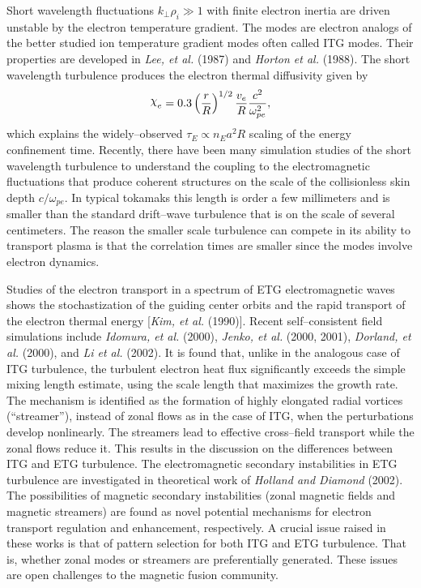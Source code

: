 \documentclass[a4paper,openany,12pt]{book}
\def\chix{\raise.5ex\hbox{$\chi$}}
\begin{document}
Short wavelength fluctuations $k_\perp\rho_i\gg 1$ with finite electron inertia are driven unstable by the electron temperature gradient. The modes are electron analogs of the better studied ion temperature gradient modes often called ITG modes. Their properties are developed in \emph{Lee, et al.} (1987) and \emph{Horton et al.} (1988). The short wavelength turbulence produces the electron thermal diffusivity given by
$$\chix_e=0.3\left(\frac{r}{R}\right)^{1/2}\frac{v_e}{R}\frac{c^2}{\omega_{pe}^2},$$
which explains the widely--observed $\tau_E\propto n_Ea^2R$ scaling of the energy confinement time. Recently, there have been many simulation studies of the short wavelength turbulence to understand the coupling to the electromagnetic fluctuations that produce coherent structures on the scale of the collisionless skin depth $c/\omega_{pe}$. In typical tokamaks this length is order a few millimeters and is smaller than the standard drift--wave turbulence that is on the scale of several centimeters. The reason the smaller scale turbulence can compete in its ability to transport plasma is that the correlation times are smaller since the modes involve electron dynamics. 

Studies of the electron transport in a spectrum of ETG electromagnetic waves shows the stochastization of the guiding center orbits and the rapid transport of the electron thermal energy [\emph{Kim, et al.} (1990)]. Recent self--consistent field simulations include \emph{Idomura, et al.} (2000), \emph{Jenko, et al.} (2000, 2001), \emph{Dorland, et al.} (2000), and \emph{Li et al.} (2002). It is found that, unlike in the analogous case of ITG turbulence, the turbulent electron heat flux significantly exceeds the simple mixing length estimate, using the scale length that maximizes the growth rate. The mechanism is identified as the formation of highly elongated radial vortices (``streamer''), instead of zonal flows as in the case of ITG, when the perturbations develop nonlinearly. The streamers lead to effective cross--field transport while the zonal flows reduce it. This results in the discussion on the differences between ITG and ETG turbulence. The electromagnetic secondary instabilities in ETG turbulence are investigated in theoretical work of \emph{Holland and Diamond} (2002). The possibilities of magnetic secondary instabilities (zonal magnetic fields and magnetic streamers) are found as novel potential mechanisms for electron transport regulation and enhancement, respectively. A crucial issue raised in these works is that of pattern selection for both ITG and ETG turbulence. That is, whether zonal modes or streamers are preferentially generated. These issues are open challenges to the magnetic fusion community.
\end{document}
